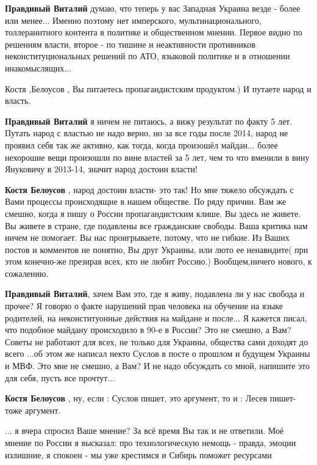 \begin{itemize}
\begin{itemize}
\textbf{Правдивый Виталий} думаю, что теперь у вас Западная Украина везде - более или менее... Именно поэтому нет имперского, мультинационального, толлераннтного контента в политике и общественном мнении. Первое видно по решениям власти, второе - по тишине и неактивности противников неконституциональных решений по АТО, языковой политике и в отношении инакомыслящих...

Костя ,Белоусов , Вы питаетесь пропагандистским продуктом.)
И путаете народ и власть.

\textbf{Правдивый Виталий} я ничем не питаюсь, а вижу результат по факту 5 лет.
Путать народ с властью не надо верно, но за все годы после 2014, народ не проявил себя так же активно, как тогда, когда произошёл майдан... более нехорошие вещи произошли по вине властей за 5 лет, чем то что вменили в вину Януковичу в 2013-14, значит народ достоин власти!

\textbf{Костя Белоусов} , народ достоин власти- это так!
Но мне тяжело обсуждать с Вами процессы происходящие в нашем обществе.
По ряду причин.
Вам же смешно, когда я пишу о России пропагандистским клише.
Вы здесь не живете.
Вы живете в стране, где подавлены все гражданские свободы.
Ваша критика нам ничем не помогает.
Вы нас проигрываете, потому, что не гибкие.
Из Ваших постов и комментов не понятно, Вы друг Украины, или люто ее ненавидите( при этом конечно-же презирая всех, кто не любит Россию.)
Вообщем,ничего нового, к сожалению.

\textbf{Правдивый Виталий}, зачем Вам это, где я живу, подавлена ли у нас свобода и прочее?
Я говорю о факте нарушений прав человека на обучение на языке родителей, на неконституонные действия на майдане и после...
Я кажется писал, что подобное майдану происходило в 90-е в России? Это не смешно, а Вам?
Советы не работают для всех, не только для Украины, общества сами доходят до всего ...об этом же написал некто Суслов в посте о прошлом и будущем Украины и МВФ. Это мне не смешно, а Вам?
И не надо обсуждать со мной, напишите это для себя, пусть все прочтут...

\textbf{Костя Белоусов} , ну, если : Суслов пишет, это аргумент, то и : Лесев пишет- тоже аргумент.

... я вчера спросил Ваше мнение?
За всё время Вы так и не ответили.
Моё мнение по России я высказал: про технологическую немощь - правда, эмоции излишние, я спокоен - мы уже крестимся и Сибирь поможет ресурсами


\end{itemize}
\end{itemize}

